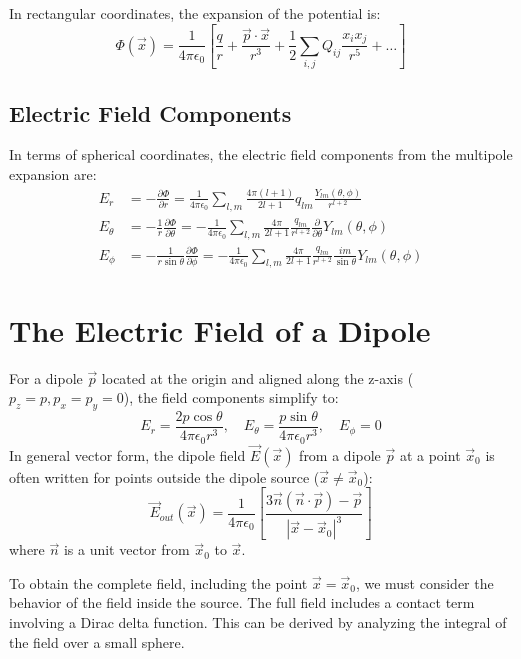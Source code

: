 \documentclass{article}
\begin{document}
	In rectangular coordinates, the expansion of the potential is:
	\[
	\Phi(\vec{x}) = \frac{1}{4\pi\epsilon_0} \left[ \frac{q}{r} + \frac{\vec{p}\cdot\vec{x}}{r^3} + \frac{1}{2} \sum_{i,j} Q_{ij} \frac{x_i x_j}{r^5} + \dots \right]
	\]
	
	\subsection{Electric Field Components}
	In terms of spherical coordinates, the electric field components from the multipole expansion are:
	\begin{align*}
		E_r &= -\frac{\partial\Phi}{\partial r} = \frac{1}{4\pi\epsilon_0} \sum_{l,m} \frac{4\pi(l+1)}{2l+1} q_{lm} \frac{Y_{lm}(\theta, \phi)}{r^{l+2}} \\
		E_\theta &= -\frac{1}{r}\frac{\partial\Phi}{\partial \theta} = -\frac{1}{4\pi\epsilon_0} \sum_{l,m} \frac{4\pi}{2l+1} \frac{q_{lm}}{r^{l+2}} \frac{\partial}{\partial \theta} Y_{lm}(\theta, \phi) \\
		E_\phi &= -\frac{1}{r\sin\theta}\frac{\partial\Phi}{\partial \phi} = -\frac{1}{4\pi\epsilon_0} \sum_{l,m} \frac{4\pi}{2l+1} \frac{q_{lm}}{r^{l+2}} \frac{i m}{\sin\theta} Y_{lm}(\theta, \phi)
	\end{align*}
	
	\section{The Electric Field of a Dipole}
	For a dipole $\vec{p}$ located at the origin and aligned along the z-axis ($p_z = p, p_x=p_y=0$), the field components simplify to:
	\[
	E_r = \frac{2p\cos\theta}{4\pi\epsilon_0 r^3}, \quad E_\theta = \frac{p\sin\theta}{4\pi\epsilon_0 r^3}, \quad E_\phi = 0
	\]
	In general vector form, the dipole field $\vec{E}(\vec{x})$ from a dipole $\vec{p}$ at a point $\vec{x}_0$ is often written for points outside the dipole source ($\vec{x} \neq \vec{x}_0$):
	\[
	\vec{E}_{out}(\vec{x}) = \frac{1}{4\pi\epsilon_0} \left[ \frac{3\vec{n}(\vec{n}\cdot\vec{p}) - \vec{p}}{|\vec{x}-\vec{x}_0|^3} \right]
	\]
	where $\vec{n}$ is a unit vector from $\vec{x}_0$ to $\vec{x}$.
	
	To obtain the complete field, including the point $\vec{x}=\vec{x}_0$, we must consider the behavior of the field inside the source. The full field includes a contact term involving a Dirac delta function. This can be derived by analyzing the integral of the field over a small sphere.
	
\end{document}
